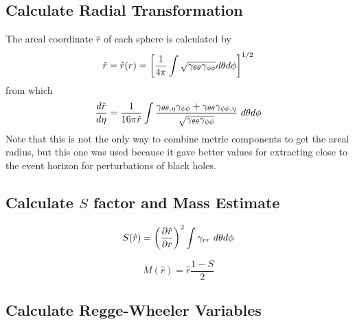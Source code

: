 \documentclass{article}
\begin{document}
\subsection{Calculate Radial Transformation}

The areal coordinate $\hat{r}$ of each sphere is calculated by
%
\begin{equation}
  \hat{r}    =  \hat{r}(r) = \left[
            \frac{1}{4\pi}
            \int\sqrt{\gamma_{\theta\theta}
            \gamma_{\phi\phi}}d\theta d\phi \right]^{1/2}
\end{equation}
%
from which
%
\begin{equation}
\frac{d\hat{r}}{d\eta} = \frac{1}{16\pi \hat{r}}
  \int\frac{\gamma_{\theta\theta,\eta}\gamma_{\phi\phi}+\gamma_{\theta\theta}\gamma_{\phi\phi,\eta}}
  {\sqrt{\gamma_{\theta\theta}\gamma_{\phi\phi}}} \ d\theta d\phi
\end{equation}
%
Note that this is not the only way to combine metric components to get
the areal radius, but this one was used because it gave better values
for extracting close to the event horizon for perturbations of black
holes.

\subsection{Calculate $S$ factor and Mass Estimate}

\begin{equation}
S(\hat{r}) = \left(\frac{\partial\hat{r}}{\partial r}\right)^2 \int \gamma_{rr} \ d\theta d\phi
\end{equation}

\begin{equation}
M(\hat{r}) = \hat{r}\frac{1-S}{2}
\end{equation}

\subsection{Calculate Regge-Wheeler Variables}
\end{document}

